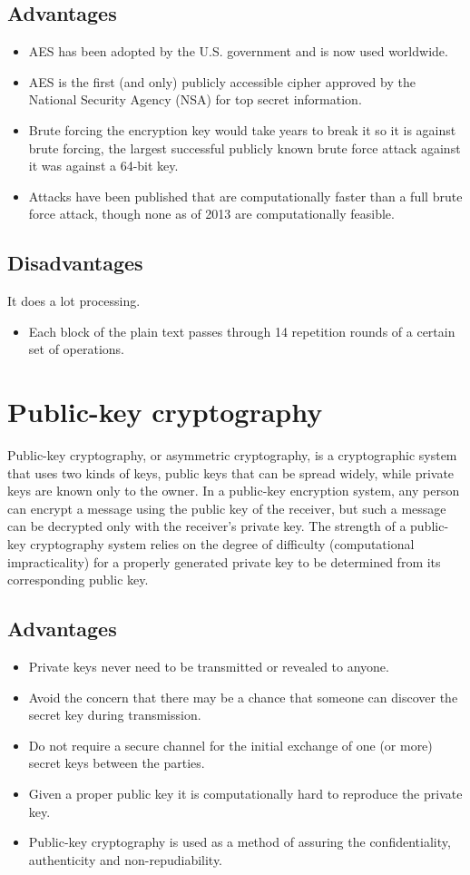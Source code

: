 \subsection{Advantages}
\begin{itemize}
	\item AES has been adopted by the U.S. government and is now used worldwide.
	\item AES is the first (and only) publicly accessible cipher approved by the National Security Agency (NSA) for top secret information.
	\item Brute forcing the encryption key would take years to break it so it is against brute forcing, the largest successful  publicly known brute force attack against it was against a 64-bit key.
	\item Attacks have been published that are computationally faster than a full brute force attack, though none as of 2013 are computationally feasible.
\end{itemize}

\subsection{Disadvantages}
It does a lot processing.
\begin{itemize}
	\item Each block of the plain text passes through 14 repetition rounds of a certain set of operations.
\end{itemize}

\section{Public-key cryptography}
Public-key cryptography, or asymmetric cryptography, is a cryptographic system that uses two kinds of keys, public keys that can be spread widely, while private keys are known only to the owner. In a public-key encryption system, any person can encrypt a message using the public key of the receiver, but such a message can be decrypted only with the receiver's private key. The strength of a public-key cryptography system relies on the degree of difficulty (computational impracticality) for a properly generated private key to be determined from its corresponding public key.
\subsection{Advantages}
\begin{itemize}
	\item Private keys never need to be transmitted or revealed to anyone.
	\item Avoid the concern that there may be a chance that someone can discover the secret key during transmission.
	\item Do not require a secure channel for the initial exchange of one (or more) secret keys between the parties.
	\item Given a proper public key it is computationally hard to reproduce the private key.
	\item Public-key cryptography is used as a method of assuring the confidentiality, authenticity and non-repudiability.
\end{itemize}
